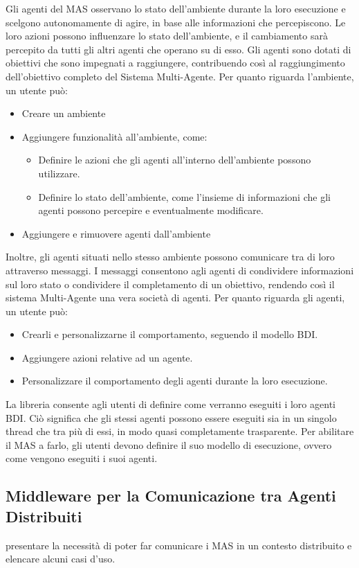 Gli agenti del MAS osservano lo stato dell'ambiente durante la loro esecuzione e scelgono autonomamente di agire, in base alle informazioni che percepiscono. Le loro azioni possono influenzare lo stato dell'ambiente, e il cambiamento sarà percepito da tutti gli altri agenti che operano su di esso. Gli agenti sono dotati di obiettivi che sono impegnati a raggiungere, contribuendo così al raggiungimento dell'obiettivo completo del Sistema Multi-Agente. Per quanto riguarda l'ambiente, un utente può:

\begin{itemize}
    \item Creare un ambiente
    \item Aggiungere funzionalità all'ambiente, come:
    \begin{itemize}
        \item Definire le azioni che gli agenti all'interno dell'ambiente possono utilizzare.
        \item Definire lo stato dell'ambiente, come l'insieme di informazioni che gli agenti possono percepire e eventualmente modificare.
    \end{itemize}
    \item Aggiungere e rimuovere agenti dall'ambiente
\end{itemize}

Inoltre, gli agenti situati nello stesso ambiente possono comunicare tra di loro attraverso messaggi. I messaggi consentono agli agenti di condividere informazioni sul loro stato o condividere il completamento di un obiettivo, rendendo così il sistema Multi-Agente una vera società di agenti. Per quanto riguarda gli agenti, un utente può:

\begin{itemize}
    \item Crearli e personalizzarne il comportamento, seguendo il modello BDI.
    \item Aggiungere azioni relative ad un agente.
    \item Personalizzare il comportamento degli agenti durante la loro esecuzione.
\end{itemize}

La libreria consente agli utenti di definire come verranno eseguiti i loro agenti BDI. Ciò significa che gli stessi agenti possono essere eseguiti sia in un singolo thread che tra più di essi, in modo quasi completamente trasparente. Per abilitare il MAS a farlo, gli utenti devono definire il suo modello di esecuzione, ovvero come vengono eseguiti i suoi agenti.

\subsection{Middleware per la Comunicazione tra Agenti Distribuiti}
presentare la necessità di poter far comunicare i MAS in un contesto distribuito e elencare alcuni casi d'uso.
